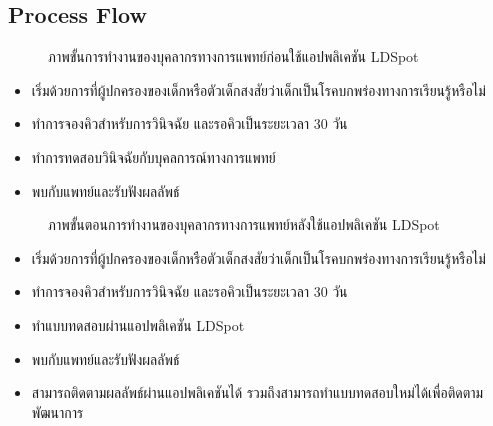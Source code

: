 \documentclass[12pt,oneside,openright,a4paper]{cpe-thai-project}
\begin{document}
\subsection{Process Flow}
\begin{figure}[!ht]\centering
  \setlength{\fboxrule}{0.2mm} %
  \setlength{\fboxsep}{1cm}
  \caption{ภาพขั้นการทำงานของบุคลากรทางการแพทย์ก่อนใช้แอปพลิเคชัน LDSpot}\label{fig:usecase}
\end{figure}
\begin{itemize}
  \item เริ่มด้วยการที่ผู้ปกครองของเด็กหรือตัวเด็กสงสัยว่าเด็กเป็นโรคบกพร่องทางการเรียนรู้หรือไม่ 
  \item ทำการจองคิวสำหรับการวินิจฉัย และรอคิวเป็นระยะเวลา 30 วัน
  \item ทำการทดสอบวินิจฉัยกับบุคลการณ์ทางการแพทย์ 
  \item พบกับแพทย์และรับฟังผลลัพธ์
\end{itemize}
\begin{figure}[!ht]\centering
  \setlength{\fboxrule}{0.2mm} %
  \setlength{\fboxsep}{1cm}
  \caption{ภาพขั้นตอนการทำงานของบุคลากรทางการแพทย์หลังใช้แอปพลิเคชัน LDSpot}\label{fig:usecase}
\end{figure}
\begin{itemize}
  \item เริ่มด้วยการที่ผู้ปกครองของเด็กหรือตัวเด็กสงสัยว่าเด็กเป็นโรคบกพร่องทางการเรียนรู้หรือไม่ 
  \item ทำการจองคิวสำหรับการวินิจฉัย และรอคิวเป็นระยะเวลา 30 วัน
  \item ทำแบบทดสอบผ่านแอปพลิเคชัน LDSpot  
  \item พบกับแพทย์และรับฟังผลลัพธ์
  \item สามารถติดตามผลลัพธ์ผ่านแอปพลิเคชันได้ รวมถึงสามารถทำแบบทดสอบใหม่ได้เพื่อติดตามพัฒนาการ
\end{itemize}
\newpage
\end{document}
